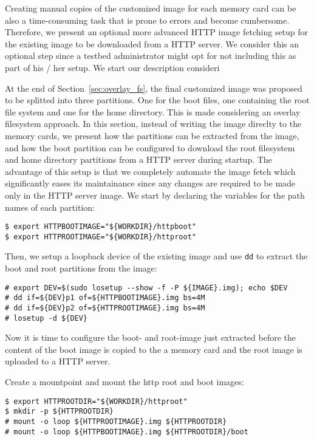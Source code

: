 \label{sec:testbed_http}
Creating manual copies of the customized image for each memory card can
be also a time-consuming task that is prone to errors and become
cumbersome. Therefore, we present an optional more advanced \ac{HTTP}
image fetching setup for the existing image to be downloaded from a
\ac{HTTP} server. We consider this an optional step since a testbed
administrator might opt for not including this as part of his / her setup.
We start our description consideri

At the end of Section~\ref{sec:overlay_fs}, the final customized image was
proposed to be splitted into three partitions. One for the boot files, one
containing the root file system and one for the home directory. This is made
considering an overlay filesystem approach. In this section, instead of
writing the image direclty to the memory cards, we present how the
partitions can be extracted from the image, and how the boot partition can
be configured to download the root filesystem and home directory partitions
from a \ac{HTTP} server during startup. The advantage of this setup is that
we completely automate the image fetch which significantly eases its
maintainance since any changes are required to be made only in the \ac{HTTP}
server image. We start by declaring the variables for the path names of each
partition:

\begin{lstlisting}[]
$ export HTTPBOOTIMAGE="${WORKDIR}/httpboot"
$ export HTTPROOTIMAGE="${WORKDIR}/httproot"
\end{lstlisting}
\FloatBarrier
\vspace{-5mm}

Then, we setup a loopback device of the existing image and use \texttt{dd} to
extract the boot and root partitions from the image:
\begin{lstlisting}[]
# export DEV=$(sudo losetup --show -f -P ${IMAGE}.img); echo $DEV
# dd if=${DEV}p1 of=${HTTPBOOTIMAGE}.img bs=4M
# dd if=${DEV}p2 of=${HTTPROOTIMAGE}.img bs=4M
# losetup -d ${DEV}
\end{lstlisting}
\FloatBarrier
\vspace{-5mm}

Now it is time to configure the boot- and root-image just extracted before
the content of the boot image is copied to the a memory card and the root
image is uploaded to a \ac{HTTP} server.

Create a mountpoint and mount the http root and boot images:
\begin{lstlisting}[]
$ export HTTPROOTDIR="${WORKDIR}/httproot"
$ mkdir -p ${HTTPROOTDIR}
# mount -o loop ${HTTPROOTIMAGE}.img ${HTTPROOTDIR}
# mount -o loop ${HTTPBOOTIMAGE}.img ${HTTPROOTDIR}/boot
\end{lstlisting}
\FloatBarrier
\vspace{-5mm}

